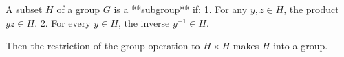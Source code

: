 A subset $H$ of a group $G$ is a **subgroup** if:
1. For any $y, z \in H$, the product $yz \in H$.
2. For every $y \in H$, the inverse $y^{-1} \in H$.

Then the restriction of the group operation to $H \times H$ makes $H$ into a group.
